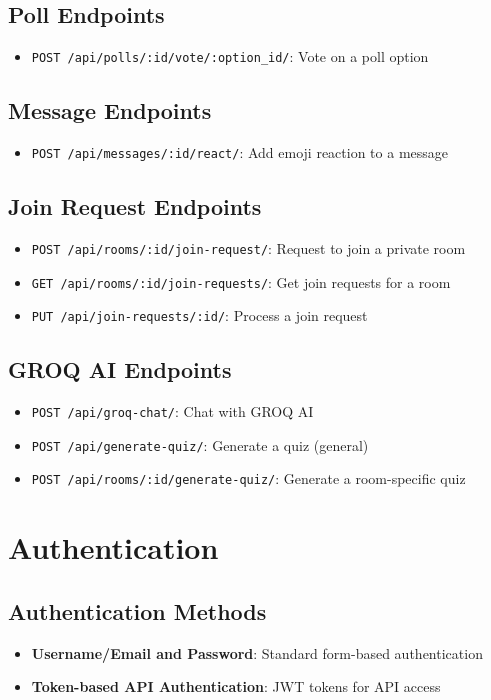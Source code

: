 \documentclass[11pt]{article}
\begin{document}
\subsection{Poll Endpoints}
\begin{itemize}
  \item \texttt{POST /api/polls/:id/vote/:option\_id/}: Vote on a poll option
\end{itemize}

\subsection{Message Endpoints}
\begin{itemize}
  \item \texttt{POST /api/messages/:id/react/}: Add emoji reaction to a message
\end{itemize}

\subsection{Join Request Endpoints}
\begin{itemize}
  \item \texttt{POST /api/rooms/:id/join-request/}: Request to join a private room
  \item \texttt{GET /api/rooms/:id/join-requests/}: Get join requests for a room
  \item \texttt{PUT /api/join-requests/:id/}: Process a join request
\end{itemize}

\subsection{GROQ AI Endpoints}
\begin{itemize}
  \item \texttt{POST /api/groq-chat/}: Chat with GROQ AI
  \item \texttt{POST /api/generate-quiz/}: Generate a quiz (general)
  \item \texttt{POST /api/rooms/:id/generate-quiz/}: Generate a room-specific quiz
\end{itemize}

\section{Authentication}

\subsection{Authentication Methods}
\begin{itemize}
  \item \textbf{Username/Email and Password}: Standard form-based authentication
  \item \textbf{Token-based API Authentication}: JWT tokens for API access
\end{itemize}
\end{document}
